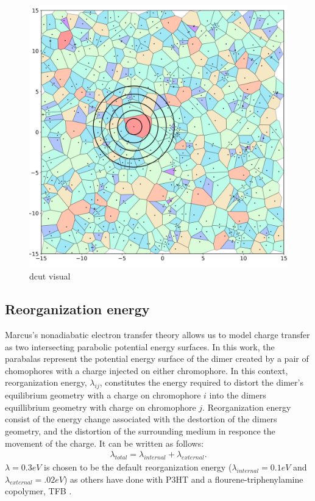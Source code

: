 \begin{figure}
  \center
  \includegraphics[width=0.8\linewidth]{figures/crystalline_voronoi_d_cut_circles.png} 
  \caption{dcut visual}
  \label{fig:dcut}
\end{figure}


\subsection{Reorganization energy}
Marcus's nonadiabatic electron transfer theory allows us to model charge transfer as two
intersecting parabolic potential energy surfaces. In this work, the parabalas represent the potential energy surface
of the dimer created by a pair of chomophores with a charge injected on either chromophore. In this context, 
reorganization energy, $\lambda_{ij}$, constitutes the energy required to distort the dimer's equilibrium geometry with a
charge on chromophore $i$ into the dimers equillibrium geometry with charge on chromophore $j$.
Reorganization energy consist of the energy change associated with the destortion of the dimers geometry,
and the distortion of the surrounding medium in responce the movement of the charge. It can be written as
follows:
\begin{align}
    \lambda_{total} = \lambda_{internal} + \lambda_{external}.
\end{align} 
$\lambda = 0.3eV$ is chosen to be the default reorganization energy ($\lambda_{internal} = 0.1eV$
and $\lambda_{external} = .02eV$) as others have done with P3HT \cite{jones2017} and
a flourene-triphenylamine copolymer, TFB \cite{Gali2017}. 

